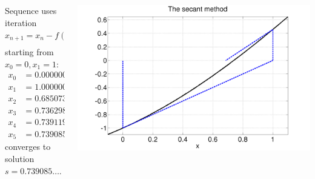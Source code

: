 \documentclass{beamer}
\begin{document}
\begin{frame}
  \begin{columns}
    \begin{column}{0.5\textwidth}
      \begin{overlayarea}{\textwidth}{0.9\textheight}
        {
          Sequence uses iteration
          \begin{equation*}
            x_{n+1} = x_n - f(x_n) \frac{x_n - x_{n-1}}{f(x_n) - f(x_{n-1})},
          \end{equation*}
          starting from $x_0=0,x_1=1$:
          \begin{align*}
            x_0 & = 0.0000000000 \\
            x_1 & = 1.0000000000 \\
            x_2 & = 0.6850733573 \\
            x_3 & = 0.7362989976 \\
            x_4 & = 0.7391193619 \\
            x_5 & = 0.7390851121
          \end{align*}
        }
        {
          converges to solution $s = 0.739085\dots$.
        }
      \end{overlayarea}
    \end{column}
    \begin{column}{0.5\textwidth}
      \begin{overlayarea}{\textwidth}{0.9\textwidth}
        {
          \begin{center}
            \includegraphics[width=\textwidth]{figures/SecantMap3}
          \end{center}
        }
        {
          \begin{center}

\end{center}}
\end{overlayarea}
\end{column}
\end{columns}
\end{frame}
\end{document}
